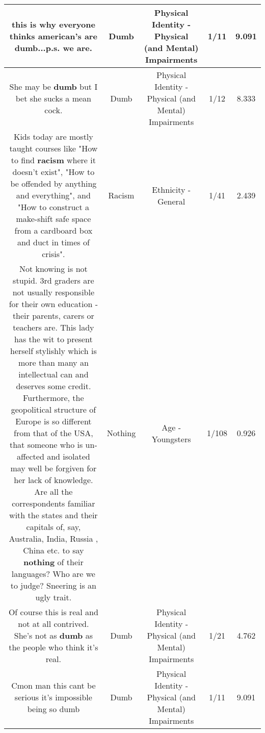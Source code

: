 \documentclass[11pt]{article}
\newlength\mylength
\begin{document}
\begin{center}
\begin{longtable}{|C{.65\mylength}|C{.30\mylength}|C{.12\mylength}|C{.12\mylength}|C{.12\mylength}|}
  \small this is why everyone thinks american's are \textbf{dumb}...p.s. we are.\normalsize   & Dumb & Physical Identity - Physical (and Mental) Impairments & 1/11 & 9.091 \\  \hline
  \small She may be \textbf{dumb} but I bet she sucks a mean cock.\normalsize   & Dumb & Physical Identity - Physical (and Mental) Impairments & 1/12 & 8.333 \\  \hline
  \small Kids today are mostly taught courses like "How to find \textbf{racism} where it doesn't exist", "How to be offended by anything and everything", and "How to construct a make-shift safe space from a cardboard box and duct  in times of crisis".\normalsize   & Racism & Ethnicity - General & 1/41 & 2.439 \\  \hline
  \small Not knowing is not stupid. 3rd graders are not usually responsible for their own education - their parents, carers or teachers are. This lady has the wit to present herself stylishly which is more than many an intellectual can and deserves some credit. Furthermore, the geopolitical structure of Europe is so different from that of the USA, that someone who is un-affected and isolated may well be forgiven for her lack of knowledge. Are all the correspondents familiar with the states and their capitals of, say, Australia, India, Russia , China etc. to say \textbf{nothing} of their languages?   Who are we to judge? Sneering is an ugly trait.\normalsize   & Nothing & Age - Youngsters & 1/108 & 0.926 \\  \hline
  \small Of course this is real and not at all contrived.  She's not as \textbf{dumb} as the people who think it's real.\normalsize   & Dumb & Physical Identity - Physical (and Mental) Impairments & 1/21 & 4.762 \\  \hline
  \small Cmon man this cant be serious it's impossible being so dumb\normalsize   & Dumb & Physical Identity - Physical (and Mental) Impairments & 1/11 & 9.091 \\  \hline

\end{longtable}
\end{center}
\end{document}
